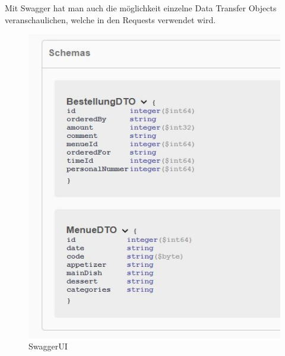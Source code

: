 Mit Swagger hat man auch die möglichkeit einzelne Data Transfer Objects veranschaulichen, welche in den Requests verwendet wird.

\begin{figure}[htp]
    \author{David Ignjatovic}
    \centering
    \includegraphics[scale=0.90]{pics/swagger-schema.jpg}
    \caption{SwaggerUI}
    \label{fig:impl:swagger-schema}
\end{figure}





